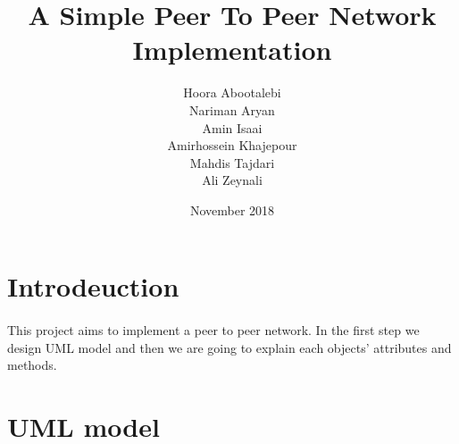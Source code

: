 \documentclass{article}
\title{A Simple Peer To Peer Network Implementation}
\author{Hoora Abootalebi\\Nariman Aryan\\Amin Isaai\\Amirhossein Khajepour\\Mahdis Tajdari\\Ali Zeynali}
\date{ November 2018}
\begin{document}
\large
\maketitle
\clearpage
\tableofcontents
\clearpage
\section{Introdeuction}
\paragraph{}This project aims to implement a peer to peer network. In the first step we design UML model and then we are going to explain each objects' attributes and methods. 
\section{UML model}
\end{document}
